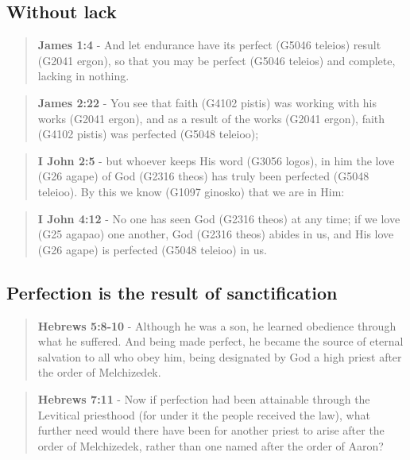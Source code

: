 \documentclass[11pt]{article}
\begin{document}
\subsection{Without lack}
\label{sec:orgd5ef3c6}
\begin{quote}
\textbf{James 1:4} - And let endurance have its perfect (G5046 teleios) result (G2041 ergon), so that you may be perfect (G5046 teleios) and complete, lacking in nothing.
\end{quote}

\begin{quote}
\textbf{James 2:22} - You see that faith (G4102 pistis) was working with his works (G2041 ergon), and as a result of the works (G2041 ergon), faith (G4102 pistis) was perfected (G5048 teleioo);
\end{quote}

\begin{quote}
\textbf{I John 2:5} - but whoever keeps His word (G3056 logos), in him the love (G26 agape) of God (G2316 theos) has truly been perfected (G5048 teleioo). By this we know (G1097 ginosko) that we are in Him:
\end{quote}

\begin{quote}
\textbf{I John 4:12} - No one has seen God (G2316 theos) at any time; if we love (G25 agapao) one another, God (G2316 theos) abides in us, and His love (G26 agape) is perfected (G5048 teleioo) in us.
\end{quote}

\subsection{Perfection is the result of sanctification}
\label{sec:orgae8ded6}

\begin{quote}
\textbf{Hebrews 5:8-10} - Although he was a son, he learned obedience through what he suffered. And being made perfect, he became the source of eternal salvation to all who obey him, being designated by God a high priest after the order of Melchizedek.
\end{quote}

\begin{quote}
\textbf{Hebrews 7:11} - Now if perfection had been attainable through the Levitical priesthood (for under it the people received the law), what further need would there have been for another priest to arise after the order of Melchizedek, rather than one named after the order of Aaron?
\end{quote}
\end{document}
